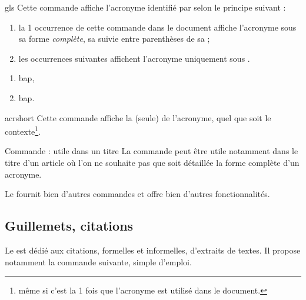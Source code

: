 \begin{docCommand}{gls}{}
  Cette commande affiche l'acronyme identifié par  selon le principe
  suivant :
  \begin{enumerate}
  \item la 1\iere{} occurrence de cette commande dans le document affiche
    l'acronyme sous sa forme \emph{complète}, \ie*{} sa 
    suivie entre parenthèses de sa  ;
  \item les occurrences suivantes affichent l'acronyme uniquement sous
    .
  \end{enumerate}
\end{docCommand}

\begin{preamblecode}
\end{preamblecode}
\begin{bodycode}
\begin{enumerate}
\item \gls{bap},
\item \gls{bap}.
\end{enumerate}
\end{bodycode}

\begin{docCommand}{acrshort}{}
  Cette commande affiche la  (seule) de l'acronyme, quel que
  soit le contexte\footnote{\Ie*{} même si c'est la 1\iere{} fois que l'acronyme
    est utilisé dans le document.}.
\end{docCommand}

\begin{dbremark}{Commande  : utile dans un titre}{}
  La commande  peut être utile notamment dans le titre d'un
  article où l'on ne souhaite pas que soit détaillée la forme complète d'un
  acronyme.
\end{dbremark}

Le  fournit bien d'autres commandes et offre bien d'autres
fonctionnalités\autocite[Pour plus de détails, cf. par exemple][]{Bitouze7}.

\subsection{Guillemets, citations}
\label{sec-guillemets-citations}

Le  est dédié aux citations, formelles et informelles,
d'extraits de textes. Il propose notamment la commande 
suivante, simple d'emploi.

